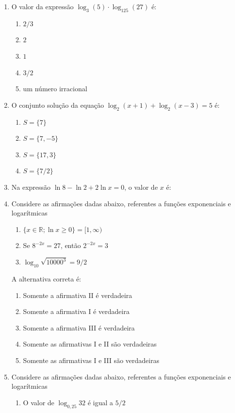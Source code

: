 \begin{enumerate}
	\item O valor da expressão $\log_3(5)\cdot\log_{125}(27)$ é:

	\begin{enumerate}
		\item $2/3$
		\item $2$
		\item $1$
		\item $3/2$
		\item um número irracional
	\end{enumerate}

	\item O conjunto solução da equação $\log_2(x + 1) + \log_2(x-3) = 5$ é:
	\begin{enumerate}
		\item $ S = \{7\}$
		\item $S = \{7, - 5\}$
		\item $S = \{17,3\}$
		\item $S = \{7/2\}$
	\end{enumerate}

	\item Na expressão $\ln 8-\ln 2 + 2\ln x = 0$, o valor de $x$ é:

	\item Considere as afirmações dadas abaixo, referentes a funções exponenciais e logarítmicas
	\begin{enumerate}
		\item[I.] $\{x\in\mathbb{R};\ln x\geq 0\}=[1,\infty)$

		\item[II.] Se $8^{-2x}=27$, então $2^{-2x}=3$

		\item[III.] $\log_{10}\sqrt{10000^3}=9/2$
	\end{enumerate}

	A alternativa correta é:
	\begin{enumerate}
		\item[(a)] Somente a afirmativa II é verdadeira
		\item[(b)] Somente a afirmativa I é verdadeira
		\item[(c)] Somente a afirmativa III é verdadeira
		\item[(d)] Somente as afirmativas I e II são verdadeiras
		\item[(e)] Somente as afirmativas I e III são verdadeiras
	\end{enumerate}


	\item Considere as afirmações dadas abaixo, referentes a funções exponenciais e logarítmicas
	\begin{enumerate}
		\item[I.] O valor de $\log_{0,25} 32$ é igual a $5/2$


\end{enumerate}
\end{enumerate}
